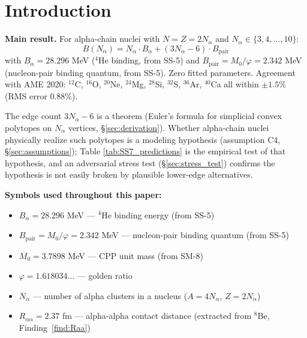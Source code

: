 \documentclass[11pt,letterpaper]{article}
\newcommand{\phig}{\varphi}
\newcommand{\Mzero}{M_0}
\newcommand{\Bpair}{B_{\mathrm{pair}}}
\newcommand{\Balpha}{B_{\alpha}}
\newcommand{\Nalpha}{N_{\alpha}}
\newcommand{\Raa}{R_{\alpha\alpha}}
\begin{document}
\bigskip
\raggedright
\tableofcontents
\newpage

\section{Introduction}
\label{sec:intro}

\begin{mdframed}[backgroundcolor=blue!5, linewidth=0.8pt, roundcorner=5pt]
\textbf{Main result.} For alpha-chain nuclei with $N = Z = 2\Nalpha$ and $\Nalpha \in \{3, 4, \ldots, 10\}$:
\begin{equation}
\boxed{\;B(\Nalpha) = \Nalpha \cdot \Balpha + (3\Nalpha - 6) \cdot \Bpair\;}
\label{eq:main}
\end{equation}
with $\Balpha = 28.296$ MeV (${}^4$He binding, from SS-5) and $\Bpair = \Mzero/\phig = 2.342$ MeV (nucleon-pair binding quantum, from SS-5). Zero fitted parameters. Agreement with AME 2020: ${}^{12}$C, ${}^{16}$O, ${}^{20}$Ne, ${}^{24}$Mg, ${}^{28}$Si, ${}^{32}$S, ${}^{36}$Ar, ${}^{40}$Ca all within $\pm 1.5\%$ (RMS error 0.88\%). 

The edge count $3\Nalpha - 6$ is a theorem (Euler's formula for simplicial convex polytopes on $\Nalpha$ vertices, \S\ref{sec:derivation}). Whether alpha-chain nuclei physically realize such polytopes is a modeling hypothesis (assumption C4, \S\ref{sec:assumptions}); Table \ref{tab:SS7_predictions} is the empirical test of that hypothesis, and an adversarial stress test (\S\ref{sec:stress_test}) confirms the hypothesis is not easily broken by plausible lower-edge alternatives.
\end{mdframed}

\begin{mdframed}[backgroundcolor=gray!5, linewidth=0.5pt, roundcorner=3pt]
\textbf{Symbols used throughout this paper:}
\begin{itemize}\setlength\itemsep{0pt}
\item $\Balpha = 28.296$ MeV --- ${}^4$He binding energy (from SS-5)
\item $\Bpair = M_0/\varphi = 2.342$ MeV --- nucleon-pair binding quantum (from SS-5)
\item $M_0 = 3.7898$ MeV --- CPP unit mass (from SM-8)
\item $\varphi = 1.618034\ldots$ --- golden ratio
\item $\Nalpha$ --- number of alpha clusters in a nucleus ($A = 4\Nalpha$, $Z = 2\Nalpha$)
\item $\Raa = 2.37$ fm --- alpha-alpha contact distance (extracted from ${}^8$Be, Finding~\ref{find:Raa})
\end{itemize}
\end{mdframed}
\end{document}
